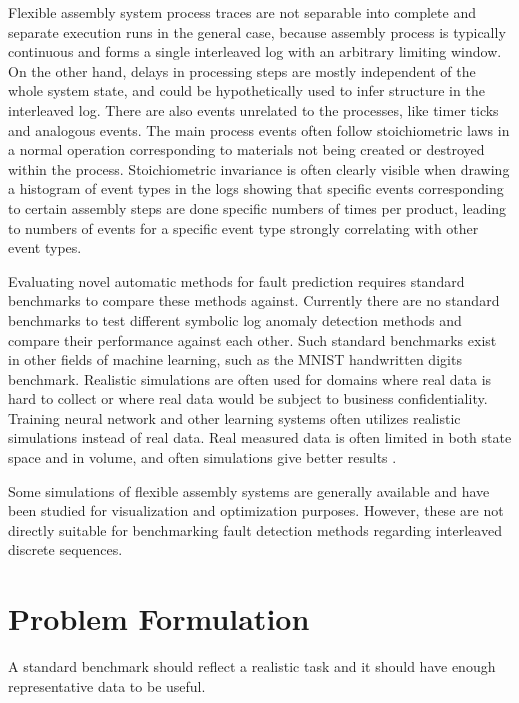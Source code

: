 \documentclass[journal]{IEEEtran}
\begin{document}
Flexible assembly system process traces are not separable into complete and separate execution runs in the general case, because assembly process is typically continuous and
forms a single interleaved log with an arbitrary limiting window.
On the other hand, delays in processing steps are mostly independent of the whole system state, and could be hypothetically used to infer structure in the interleaved log.
There are also events unrelated to the processes, like timer ticks and analogous events. The main process events often follow stoichiometric laws in a normal operation corresponding to materials
not being created or destroyed within the process. Stoichiometric invariance is often clearly visible when drawing a histogram of event types in the logs showing that specific events corresponding to certain
assembly steps are done specific numbers of times per product, leading to numbers of events for a specific event type strongly correlating with other event types.

Evaluating novel automatic methods for fault prediction requires standard benchmarks to compare these methods against. Currently there are no standard benchmarks to test
different symbolic log anomaly detection methods and compare their performance against each other. Such standard benchmarks exist in other fields of machine learning,
such as the MNIST handwritten digits benchmark\cite{lecun-mnisthandwrittendigit-2010}. Realistic simulations are often used\cite{jager2014assessing} for domains where
real data is hard to collect or where real data would be subject to business confidentiality. Training neural network and other learning systems often utilizes realistic
simulations instead of real data\cite{weston2014memory}. Real measured data is often limited in both state space and in volume,
and often simulations give better results \cite{duch2005artificial}.

Some simulations of flexible assembly systems are generally available\cite{giulio} and have been studied for visualization and optimization purposes.
However, these are not directly suitable for benchmarking fault detection methods regarding interleaved discrete sequences.

\section{Problem Formulation}

A standard benchmark should reflect a realistic task and it should have enough representative data to be useful.
\end{document}
